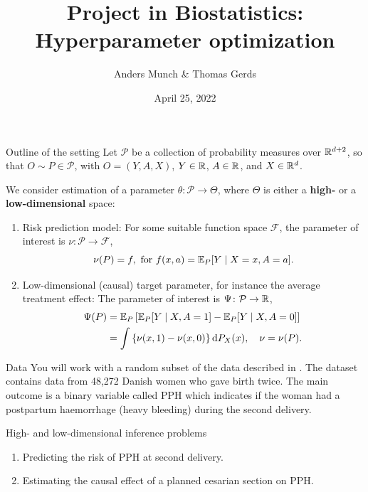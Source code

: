 \documentclass[smaller]{beamer}\usepackage{listings}
\author{Anders Munch \& Thomas Gerds}
\date{April 25, 2022}
\title{Project in Biostatistics: Hyperparameter optimization}
\begin{document}
\maketitle
\begin{frame}[label={sec:orgfa277ec}]{Outline of the setting}
Let $\mathcal{P}$ be a collection of probability measures over $\mathbb{R}^{d+2}$, so that
$O \sim P \in \mathcal{P}$, with $O = (Y, A, X)$, $Y\in \mathbb{R}$, $A\in \mathbb{R}$, and $X \in \mathbb{R}^d$.

\vfill

We consider estimation of a parameter $\theta \colon \mathcal{P} \rightarrow \Theta$, where $\Theta$
is either a \textbf{high-} or a \textbf{low-dimensional} space:

\vfill

\begin{enumerate}
\item Risk prediction model: For some suitable function space \(\mathcal{F}\), the parameter of interest
is \(\nu \colon \mathcal{P} \rightarrow \mathcal{F}\), \[\nu(P) = f, \text{ for } f(x, a) = \operatorname{\mathbb{E}}_P[Y
   \mid X=x, A=a]. \]
\item Low-dimensional (causal) target parameter, for instance the average treatment effect: The
parameter of interest is \(\Psi \colon \mathcal{P} \rightarrow \mathbb{R}\),
\begin{align*}
  \Psi(P)
  & = \operatorname{\mathbb{E}}_P{\left[ \operatorname{\mathbb{E}}_P[Y \mid X, A=1] - \operatorname{\mathbb{E}}_P[Y \mid X, A=0] \right]} \\
  & = \int {\left\{ \nu(x, 1) - \nu(x, 0) \right\}} \mathop{}\!\mathrm{d} P_X(x),
    \quad \nu = \nu(P).
\end{align*}
\end{enumerate}
\end{frame}

\begin{frame}[label={sec:org3ca5003}]{Data}
You will work with a random subset of the data described in \cite{wikkelso2014prediction}. The
dataset contains data from 48,272 Danish women who gave birth twice. The main outcome is a binary
variable called PPH which indicates if the woman had a postpartum haemorrhage (heavy bleeding)
during the second delivery.

\vfill

\begin{block}{High- and low-dimensional inference problems}
\begin{enumerate}
\item Predicting the risk of PPH at second delivery.
\item Estimating the causal effect of a planned cesarian section on PPH.
\end{enumerate}
\end{block}
\end{frame}
\end{document}
